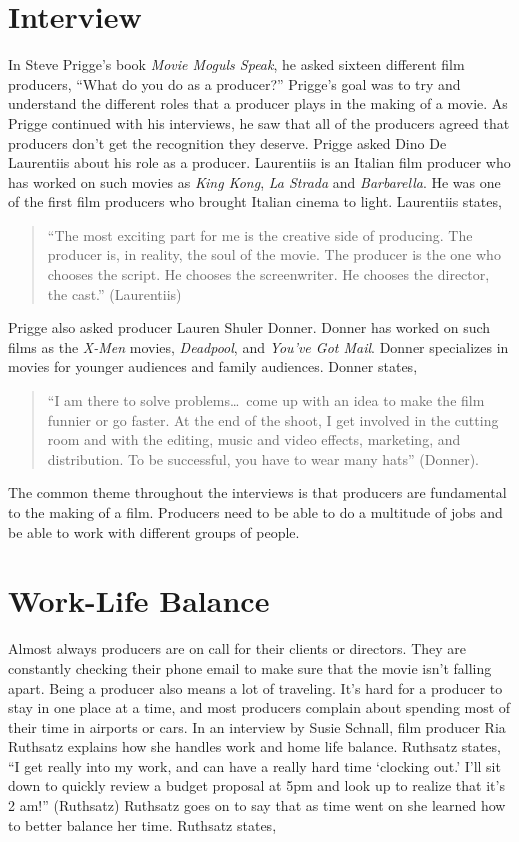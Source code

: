 \begin{multicols}{2}
\section{Interview}
	In Steve Prigge’s book \textit{Movie Moguls Speak}, he asked sixteen different film producers, “What do you do as a producer?” Prigge’s goal was to try and understand the different roles that a producer plays in the making of a movie. As Prigge continued with his interviews, he saw that all of the producers agreed that producers don’t get the recognition they deserve. 
	Prigge asked Dino De Laurentiis about his role as a producer. Laurentiis is an Italian film producer who has worked on such movies as \textit{King Kong}, \textit{La Strada} and \textit{Barbarella}. He was one of the first film producers who brought Italian cinema to light. Laurentiis states, 
\begin{quote}
	“The most exciting part for me is the creative side of producing. The producer is, in reality, the soul of the movie. The producer is the one who chooses the script. He chooses the screenwriter. He chooses the director, the cast.” (Laurentiis) 
\end{quote}
	Prigge also asked producer Lauren Shuler Donner. Donner has worked on such films as the \textit{X-Men} movies, \textit{Deadpool}, and \textit{You’ve Got Mail}. Donner specializes in movies for younger audiences and family audiences. Donner states,
\begin{quote}
	“I am there to solve problems\ldots\ come up with an idea to make the film funnier or go faster. At the end of the shoot, I get involved in the cutting room and with the editing, music and video effects, marketing, and distribution. To be successful, you have to wear many hats” (Donner).
\end{quote}
	The common theme throughout the interviews is that producers are fundamental to the making of a film. Producers need to be able to do a multitude of jobs and be able to work with different groups of people.

\section{Work-Life Balance}
	Almost always producers are on call for their clients or directors. They are constantly checking their phone email to make sure that the movie isn’t falling apart. Being a producer also means a lot of traveling. It’s hard for a producer to stay in one place at a time, and most producers complain about spending most of their time in airports or cars. In an interview by Susie Schnall, film producer Ria Ruthsatz explains how she handles work and home life balance. Ruthsatz states, “I get really into my work, and can have a really hard time ‘clocking out.’ I’ll sit down to quickly review a budget proposal at 5pm and look up to realize that it’s 2 am!” (Ruthsatz) Ruthsatz goes on to say that as time went on she learned how to better balance her time. Ruthsatz states, 
	

\end{multicols}
